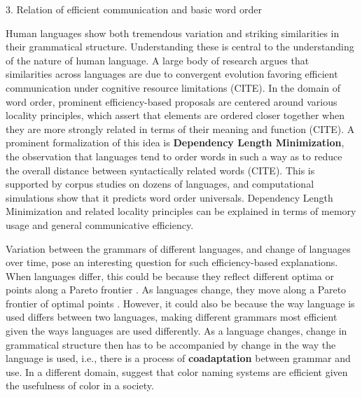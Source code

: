\documentclass[11pt,a4paper]{article}
\newcommand{\key}[1]{\textbf{#1}}
\begin{document}

{\color{blue}3. Relation of efficient communication and basic word order}


Human languages show both tremendous variation and striking similarities in their grammatical structure. Understanding these is central to the understanding of the nature of human language.
A large body of research argues that similarities across languages are due to convergent evolution favoring efficient communication under cognitive resource limitations (CITE).
In the domain of word order, prominent efficiency-based proposals are centered around various locality principles, which assert that elements are ordered closer together when they are more strongly related in terms of their meaning and function (CITE).
A prominent formalization of this idea is \key{Dependency Length Minimization}, the observation that languages tend to order words in such a way as to reduce the overall distance between syntactically related words (CITE).
This is supported by corpus studies on dozens of languages, and computational simulations show that it predicts word order universals.
Dependency Length Minimization and related locality principles can be explained in terms of memory usage and general communicative efficiency.

Variation between the grammars of different languages, and change of languages over time, pose an interesting question for such efficiency-based explanations.
When languages differ, this could be because they reflect different optima or points along a Pareto frontier \citep{zaslavsky2018efficient, hahn2020universals}.
As languages change, they move along a Pareto frontier of optimal points \citep{zaslavsky2019evolution}.
However, it could also be because the way language is used differs between two languages, making different grammars most efficient given the ways languages are used differently.
As a language changes, change in grammatical structure then has to be accompanied by change in the way the language is used, i.e., there is a process of \key{coadaptation} between grammar and use.
In a different domain, \cite{gibson2017color} suggest that color naming systems are efficient given the usefulness of color in a society.
\end{document}
